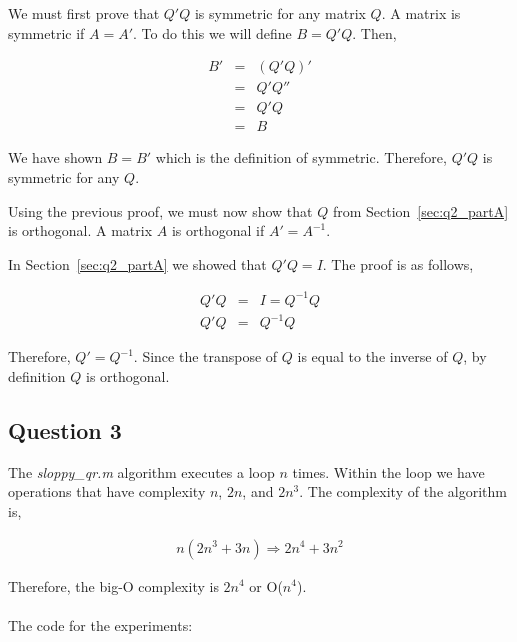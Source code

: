 We must first prove that \(Q'Q\) is symmetric for any matrix \(Q\).
A matrix is symmetric if \(A = A'\).
To do this we will define \(B = Q'Q\).
Then,

\begin{eqnarray}
  B' &=& (Q'Q)' \\
  &=& Q'Q'' \\
  &=& Q'Q \\
  &=& B
\end{eqnarray}

We have shown \(B = B'\) which is the definition of symmetric. 
Therefore, \(Q'Q\) is symmetric for any \(Q\). 

Using the previous proof, we must now show that \(Q\) from Section~\ref{sec:q2_partA} is orthogonal.
A matrix \(A\) is orthogonal if \(A' = A^{-1}\).

In Section~\ref{sec:q2_partA} we showed that \(Q'Q = I\).
The proof is as follows,

\begin{eqnarray}
  Q'Q &=& I = Q^{-1}Q \\
  Q'Q &=& Q^{-1}Q
\end{eqnarray}

Therefore, \(Q' = Q^{-1}\).
Since the transpose of \(Q\) is equal to the inverse of \(Q\), by definition \(Q\) is orthogonal.

\newpage
\subsection{Question 3}

The {\em sloppy\_qr.m} algorithm executes a loop \(n\) times.
Within the loop we have operations that have complexity \(n\), \(2n\), and \(2n^{3}\).
The complexity of the algorithm is,

\begin{eqnarray}
  n(2n^{3}+3n) \Rightarrow \boxed{2n^{4}+3n^2}
\end{eqnarray}

Therefore, the big-O complexity is \(2n^{4}\) or O(\(n^4\)).
\\
\\
The code for the experiments:


